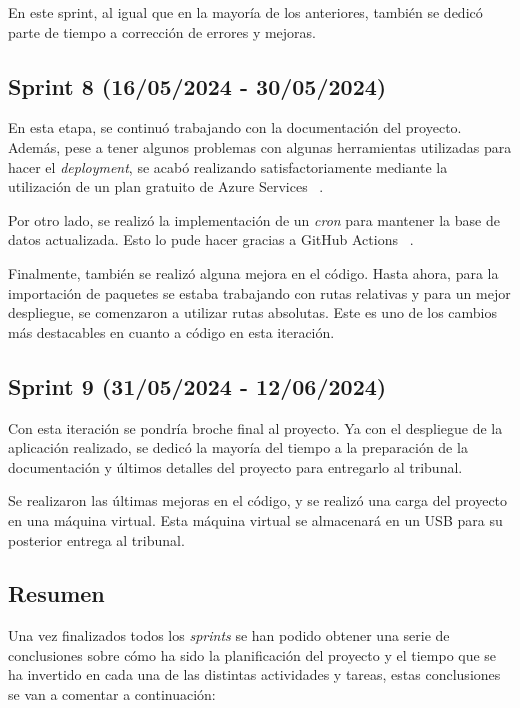 En este sprint, al igual que en la mayoría de los anteriores, también se dedicó parte de tiempo a corrección de errores y mejoras.


\subsection{Sprint 8 (16/05/2024 -
30/05/2024)}
En esta etapa, se continuó trabajando con la documentación del proyecto. Además, pese a tener algunos problemas con algunas herramientas utilizadas para hacer el \textit{deployment}, se acabó realizando satisfactoriamente mediante la utilización de un plan gratuito de Azure Services ~\cite{azureservices:latex}. 

Por otro lado, se realizó la implementación de un \textit{cron} para mantener la base de datos actualizada. Esto lo pude hacer gracias a GitHub Actions ~\cite{githubactions:latex}.

Finalmente, también se realizó alguna mejora en el código. Hasta ahora, para la importación de paquetes se estaba trabajando con rutas relativas y para un mejor despliegue, se comenzaron a utilizar rutas absolutas. Este es uno de los cambios más destacables en cuanto a código en esta iteración.

\subsection{Sprint 9 (31/05/2024 -
12/06/2024)}
Con esta iteración se pondría broche final al proyecto. Ya con el despliegue de la aplicación realizado, se dedicó la mayoría del tiempo a la preparación de la documentación y últimos detalles del proyecto para entregarlo al tribunal.

Se realizaron las últimas mejoras en el código,  y se realizó una carga del proyecto en una máquina virtual. Esta máquina virtual se almacenará en un USB para su posterior entrega al tribunal.


\subsection{Resumen}

Una vez finalizados todos los \textit{sprints} se han podido obtener una serie de conclusiones sobre cómo ha sido la planificación del proyecto y el tiempo que se ha invertido en cada una de las distintas actividades y tareas, estas conclusiones se van a comentar a continuación:

